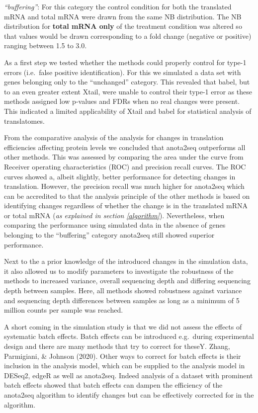 \documentclass[
  12pt,
  openany]{book}
\begin{document}
\emph{``buffering''}: For this category the control condition for both the translated mRNA and total mRNA were drawn from the same NB distribution. The NB distribution for \textbf{total mRNA only} of the treatment condition was altered so that values would be drawn corresponding to a fold change (negative or positive) ranging between 1.5 to 3.0.

As a first step we tested whether the methods could properly control for type-1 errors (i.e.~false positive identification). For this we simulated a data set with genes belonging only to the ``unchanged'' category. This revealed that babel, but to an even greater extent Xtail, were unable to control their type-1 error as these methods assigned low p-values and FDRs when no real changes were present. This indicated a limited applicability of Xtail and babel for statistical analysis of translatomes.

From the comparative analysis of the analysis for changes in translation efficiencies affecting protein levels we concluded that anota2seq outperforms all other methods. This was assessed by comparing the area under the curve from Receiver operating characteristics (ROC) and precision recall curves. The ROC curves showed a, albeit slightly, better performance for detecting changes in translation. However, the precision recall was much higher for anota2seq which can be accredited to that the analysis principle of the other methods is based on identifying changes regardless of whether the change is in the translated mRNA or total mRNA (\emph{as explained in section \ref{algorithm}}). Nevertheless, when comparing the performance using simulated data in the absence of genes belonging to the ``buffering'' category anota2seq still showed superior performance.

Next to the a prior knowledge of the introduced changes in the simulation data, it also allowed us to modify parameters to investigate the robustness of the methods to increased variance, overall sequencing depth and differing sequencing depth between samples. Here, all methods showed robustness against variance and sequencing depth differences between samples as long as a minimum of 5 million counts per sample was reached.

A short coming in the simulation study is that we did not assess the effects of systematic batch effects. Batch effects can be introduced e.g.~during experimental design and there are many methods that try to correct for theseY. Zhang, Parmigiani, \& Johnson (2020). Other ways to correct for batch effects is their inclusion in the analysis model, which can be supplied to the analysis model in DESeq2, edgeR as well as anota2seq. Indeed analysis of a dataset with prominent batch effects showed that batch effects can dampen the efficiency of the anota2seq algorithm to identify changes but can be effectively corrected for in the algorithm.
\end{document}
